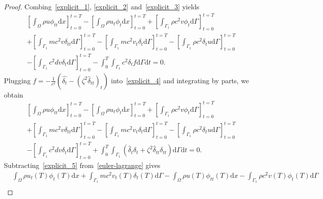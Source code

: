 \documentclass[10pt]{elsarticle}
\begin{document}
\begin{proof}
Combing~\eqref{explicit_1}, \eqref{explicit_2} and~\eqref{explicit_3} yields
\begin{equation}\label{explicit_4}
\begin{split}
&\left[\int_{\Omega}\rho u {\phi}_{tt} \mathrm{d}x\right]_{t=0}^{t=T} - \left[\int_{\Omega}\rho u_{t} {\phi_t}\mathrm{d}x \right]_{t=0}^{t=T} + \left[\int_{\Gamma_1}\rho c^{2}v  {\phi_t}\mathrm{d}\Gamma\right]_{t=0}^{t=T}\\
&+\left[\int_{\Gamma_1}m c^{2}v  {\delta}_{tt}\mathrm{d}\Gamma\right]_{t=0}^{t=T} - \left[\int_{\Gamma_1}m c^{2}v_{t}  {\delta_t}\mathrm{d}\Gamma\right]_{t=0}^{t=T}-\left[\int_{\Gamma_1}\rho c^{2}  {\delta_t} u\mathrm{d}\Gamma\right]_{t=0}^{t=T}\\
&-\left[\int_{\Gamma_1} c^{2} d {v}\delta_t\mathrm{d}\Gamma \right]_{t=0}^{t=T} - \int_{0}^{T}\int_{\Gamma_1}c^{2}\delta_t f\mathrm{d}\Gamma \mathrm{d}t=0.
 \end{split}
\end{equation}
Plugging $f = -\frac{1}{c^2}\left(\hat{\delta_t} - (\zeta^2\hat{\delta}_{tt})_t\right)$ into~\eqref{explicit_4} and integrating by parts, we obtain
\begin{equation}\label{explicit_5}
\begin{split}
&\left[\int_{\Omega}\rho u {\phi}_{tt} \mathrm{d}x\right]_{t=0}^{t=T} - \left[\int_{\Omega}\rho u_{t} {\phi_t}\mathrm{d}x \right]_{t=0}^{t=T} + \left[\int_{\Gamma_1}\rho c^{2}v  {\phi_t}\mathrm{d}\Gamma\right]_{t=0}^{t=T}\\
&+\left[\int_{\Gamma_1}m c^{2}v  {\delta}_{tt}\mathrm{d}\Gamma\right]_{t=0}^{t=T} - \left[\int_{\Gamma_1}m c^{2}v_{t}  {\delta_t}\mathrm{d}\Gamma\right]_{t=0}^{t=T}-\left[\int_{\Gamma_1}\rho c^{2}  {\delta_t} u\mathrm{d}\Gamma\right]_{t=0}^{t=T}\\
&-\left[\int_{\Gamma_1} c^{2} d {v}\delta_t\mathrm{d}\Gamma \right]_{t=0}^{t=T}+ \int_{0}^{T}\int_{\Gamma_1} \left(\hat{\delta}_{t}\delta_t  + \zeta^2\hat{\delta}_{tt} \delta_{tt}\right)\mathrm{d}\Gamma \mathrm{d}t=0.
 \end{split}
\end{equation}
Subtracting~\eqref{explicit_5} from~\eqref{euler-lagrange} gives
\begin{equation}\label{explicit_6}
\begin{split}
&\int_{\Omega}\rho u_{t}(T)\phi_t(T)\mathrm{d}x + \int_{\Gamma_1}m c^2 v_{t}(T)\delta_t(T)\mathrm{d}\Gamma- \int_{\Omega}\rho u(T)\phi_{tt}(T)\mathrm{d}x - \int_{\Gamma_1}\rho c^2 v(T)\phi_t(T)\mathrm{d}\Gamma\\

\end{split}
\end{equation}
\end{proof}
\end{document}
